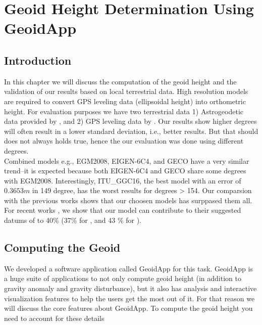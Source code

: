 \chapter{Geoid Height Determination Using GeoidApp}
\label{Chapter4}


\section{Introduction}
In this chapter we will discuss the computation of the geoid height and the validation of our results based on local terrestrial data. High resolution models are required to convert GPS leveling data (ellipsoidal height) into orthometric height. For evaluation purposes we have two terrestrial data 1) Astrogeodetic data provided by \cite{osman}, and 2) GPS leveling data by \cite{ahmed_msc}. Our results show higher degrees will often result in a lower standard deviation, i.e., better results. But that should does not always holds true, hence the our evaluation was done using different degrees.
\\
Combined models e.g., EGM2008, EIGEN-6C4, and GECO have a very similar trend--it is expected because both EIGEN-6C4 and GECO share some degrees with EGM2008. Interestingly, ITU\_GGC16, the best model with an error of $0.3653m$ in 149 degree, has the worst results for degrees > 154. Our comparsion with the previous works \citep{ahmed_msc, fashir, godah} shows that our choosen models has surppased them all. For recent works \citep{ahmed_msc, godah}, we show that our model can contribute to their suggested datums of to 40\% (37\% for \citep{ahmed_msc}, and 43 \% for \citep{godah}).



\section{Computing the Geoid}

We developed a software application called GeoidApp for this task. GeoidApp is a huge suite of applications to not only compute geoid height (in addition to gravity anomaly and gravity disturbance), but it also has analysis and interactive visualization features to help the users get the most out of it. For that reason we will discuss the core features about GeoidApp. To compute the geoid height you need to account for these details

